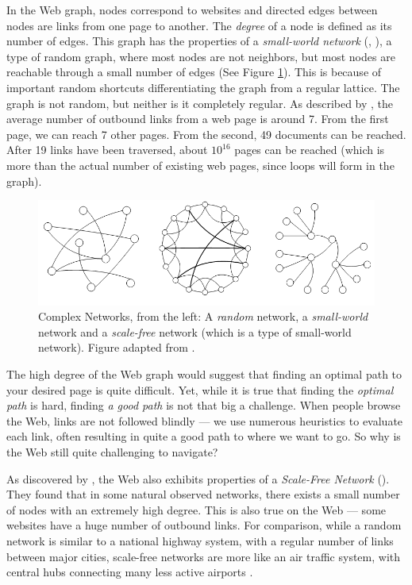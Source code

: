 In the Web graph, nodes correspond to websites and
directed edges between nodes are links from one page to another. The \emph{degree} of a node is defined as its number of edges.
This graph has the properties of a \emph{small-world network} (\citep{Newman2000}, \citep[p2]{Huang2005}), 
a type of random graph, where most nodes are not neighbors, but most nodes are reachable through a small number of edges (See Figure \ref{fig:swn}). 
This is because of important random shortcuts differentiating the graph from a regular lattice. 
The graph is not  random, but neither is it completely regular.
As described by \citet[p37]{Barabasi2003}, the average number of outbound links from a web page is around 7.
From the first page, we can reach 7 other pages. From the second, 49 documents can be reached. 
After 19 links have been traversed, about $10^{16}$ pages can be reached (which is more than the actual number of existing web pages, since loops will form in the graph).

\begin{figure}[t]
  \includegraphics[width=\textwidth]{../graphics/graphs}
  \caption[Examples of Complex Networks]{
    Complex Networks,
    from the left: A \emph{random} network, a \emph{small-world} network and a \emph{scale-free} network 
    (which is a type of  small-world network). Figure adapted from \citep[p2]{Huang2005}.} 
  \label{fig:swn}
\end{figure}

The high degree of the Web graph would suggest that finding an optimal path to your desired page is quite difficult. 
Yet, while it is true that finding the \emph{optimal path} is hard, finding \emph{a good path} is not that big a challenge. 
When people browse the Web, links are not followed blindly --- 
we use numerous heuristics to evaluate each link, often resulting in quite a good path to where we want to go. 
So why is the Web still quite challenging to navigate?

As discovered by \cite{Albert1999}, the Web also exhibits properties of a \emph{Scale-Free Network} (). 
They found that in some natural observed networks, there exists a small number of nodes with an extremely high degree. 
This is also true on the Web --- some websites have a huge number of outbound links. 
For comparison, while a random network is similar to a national highway system, with a regular number of links between major cities, scale-free networks are more like an air traffic system, with central hubs connecting many less active airports \citep[p71]{Barabasi2003}.

